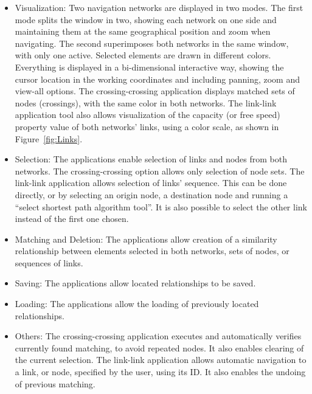 \begin{itemize}\styleItemize
\item Visualization: Two navigation networks are displayed in two modes. The first mode splits the window in two, showing each network on one side and maintaining them at the same geographical position and zoom when navigating. The second superimposes both networks in the same window, with only one active. Selected elements are drawn in different colors. Everything is displayed in a bi-dimensional interactive way, showing the cursor location in the working coordinates and including panning, zoom and view-all options. The crossing-crossing application displays matched sets of nodes (crossings), with the same color in both networks. The link-link application tool also allows visualization of the capacity (or free speed) property value of both networks' links, using a color scale, as shown in Figure~\ref{fig:Links}.
\item Selection: The applications enable selection of links and nodes from both networks. The crossing-crossing option allows only selection of node sets. The link-link application allows selection of links' sequence. This can be done directly, or by selecting an origin node, a destination node and running a ``select shortest path algorithm tool''. It is also possible to select the other link instead of the first one chosen.
\item Matching and Deletion: The applications allow creation of a similarity relationship between elements selected in both networks, sets of nodes, or sequences of links.
\item Saving: The applications allow located relationships to be saved.
\item Loading: The applications allow the loading of previously located relationships.
\item Others: The crossing-crossing application executes and automatically verifies currently found matching, to avoid repeated nodes. It also enables clearing of the current selection. The link-link application allows automatic navigation to a link, or node, specified by the user, using its ID. It also enables the undoing of previous matching. 
\end{itemize}

